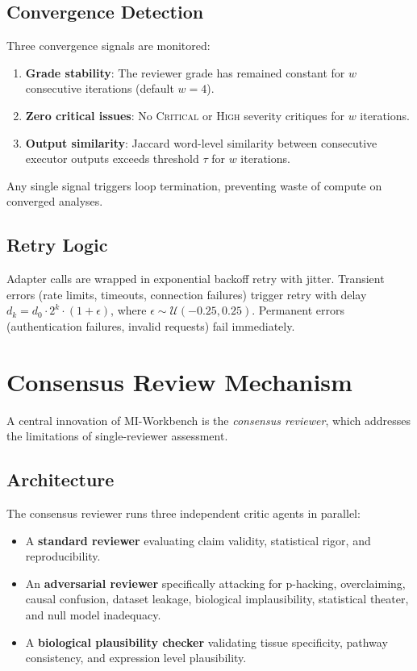 \documentclass[10pt]{article}
\begin{document}
\subsection{Convergence Detection}
Three convergence signals are monitored:
\begin{enumerate}
  \item \textbf{Grade stability}: The reviewer grade has remained constant for $w$ consecutive iterations (default $w{=}4$).
  \item \textbf{Zero critical issues}: No \textsc{Critical} or \textsc{High} severity critiques for $w$ iterations.
  \item \textbf{Output similarity}: Jaccard word-level similarity between consecutive executor outputs exceeds threshold $\tau$ for $w$ iterations.
\end{enumerate}
Any single signal triggers loop termination, preventing waste of compute on converged analyses.

\subsection{Retry Logic}
Adapter calls are wrapped in exponential backoff retry with jitter. Transient errors (rate limits, timeouts, connection failures) trigger retry with delay $d_k = d_0 \cdot 2^k \cdot (1 + \epsilon)$, where $\epsilon \sim \mathcal{U}(-0.25, 0.25)$. Permanent errors (authentication failures, invalid requests) fail immediately.


\section{Consensus Review Mechanism}
\label{sec:consensus}

A central innovation of MI-Workbench is the \emph{consensus reviewer}, which addresses the limitations of single-reviewer assessment.

\subsection{Architecture}
The consensus reviewer runs three independent critic agents in parallel:
\begin{itemize}
  \item A \textbf{standard reviewer} evaluating claim validity, statistical rigor, and reproducibility.
  \item An \textbf{adversarial reviewer} specifically attacking for p-hacking, overclaiming, causal confusion, dataset leakage, biological implausibility, statistical theater, and null model inadequacy.
  \item A \textbf{biological plausibility checker} validating tissue specificity, pathway consistency, and expression level plausibility.
\end{itemize}
\end{document}
